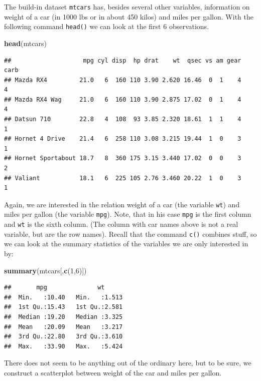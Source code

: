 \documentclass[]{article}
\newenvironment{Shaded}{\begin{snugshade}}{\end{snugshade}}
\newcommand{\KeywordTok}[1]{\textcolor[rgb]{0.13,0.29,0.53}{\textbf{#1}}}
\newcommand{\DecValTok}[1]{\textcolor[rgb]{0.00,0.00,0.81}{#1}}
\newcommand{\NormalTok}[1]{#1}
\theoremstyle{definition}
\theoremstyle{definition}
\theoremstyle{definition}
\theoremstyle{remark}
\begin{document}
The build-in dataset \texttt{mtcars} has, besides several other
variables, information on weight of a car (in 1000 lbs or in about 450
kilos) and miles per gallon. With the following command \texttt{head()}
we can look at the first 6 observations.

\begin{Shaded}
\begin{Highlighting}[]
\KeywordTok{head}\NormalTok{(mtcars)}
\end{Highlighting}
\end{Shaded}

\begin{verbatim}
##                    mpg cyl disp  hp drat    wt  qsec vs am gear carb
## Mazda RX4         21.0   6  160 110 3.90 2.620 16.46  0  1    4    4
## Mazda RX4 Wag     21.0   6  160 110 3.90 2.875 17.02  0  1    4    4
## Datsun 710        22.8   4  108  93 3.85 2.320 18.61  1  1    4    1
## Hornet 4 Drive    21.4   6  258 110 3.08 3.215 19.44  1  0    3    1
## Hornet Sportabout 18.7   8  360 175 3.15 3.440 17.02  0  0    3    2
## Valiant           18.1   6  225 105 2.76 3.460 20.22  1  0    3    1
\end{verbatim}

Again, we are interested in the relation weight of a car (the variable
\texttt{wt}) and miles per gallon (the variable \texttt{mpg}). Note,
that in his case \texttt{mpg} is the first column and \texttt{wt} is the
sixth column. (The column with car names above is not a real variable,
but are the row names). Recall that the command \texttt{c()} combines
stuff, so we can look at the summary statistics of the variables we are
only interested in by:

\begin{Shaded}
\begin{Highlighting}[]
\KeywordTok{summary}\NormalTok{(mtcars[,}\KeywordTok{c}\NormalTok{(}\DecValTok{1}\NormalTok{,}\DecValTok{6}\NormalTok{)])}
\end{Highlighting}
\end{Shaded}

\begin{verbatim}
##       mpg              wt       
##  Min.   :10.40   Min.   :1.513  
##  1st Qu.:15.43   1st Qu.:2.581  
##  Median :19.20   Median :3.325  
##  Mean   :20.09   Mean   :3.217  
##  3rd Qu.:22.80   3rd Qu.:3.610  
##  Max.   :33.90   Max.   :5.424
\end{verbatim}

There does not seem to be anything out of the ordinary here, but to be
sure, we construct a scatterplot between weight of the car and miles per
gallon.
\end{document}
